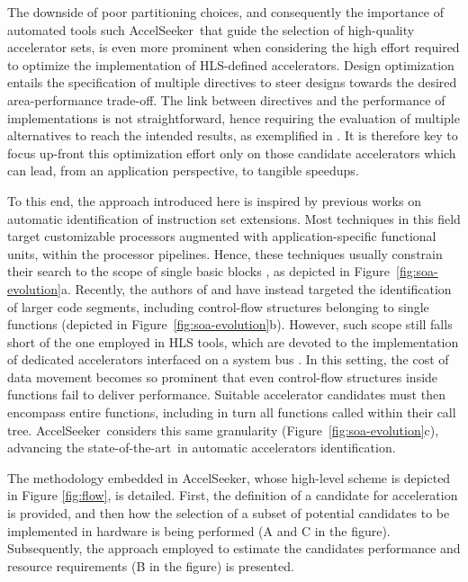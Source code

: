 \documentclass[]{usiinfthesis}
\newcommand{\aseeker}{{AccelSeeker}}
\newcommand{\SoTA}{{state-of-the-art}}
\begin{document}
The downside of poor partitioning choices, and consequently the
importance of automated tools such \aseeker\ that guide the selection
of high-quality accelerator sets, is even more prominent when
considering the high effort required to optimize the implementation of
HLS-defined accelerators. Design optimization entails the
specification of multiple directives to steer designs towards the
desired area-performance trade-off. The link between directives and
the performance of implementations is not straightforward, hence
requiring the evaluation of multiple alternatives to reach the
intended results, as exemplified in \cite{SchaferJun12}
\cite{ZuluagaJun12} \cite{FerrettiJan18} \cite{LiuJun13}. It is
therefore key to focus up-front this optimization effort only on those
candidate accelerators which can lead, from an application
perspective, to tangible speedups.\par

To this end, the approach introduced here is inspired by previous works 
on automatic
identification of instruction set extensions. Most techniques in this
field target customizable processors augmented with
application-specific functional units, within the processor pipelines.
Hence, these techniques usually constrain their search to the scope of
single basic blocks \cite{PozziJul06} \cite{GiaquintaMar15}, as
depicted in Figure~\ref{fig:soa-evolution}a.  Recently, the authors of
\cite{ZacharopoulosApr19} and \cite{OppermannJul16} have instead
targeted the identification of larger code segments, including
control-flow structures belonging to single functions (depicted in
Figure~\ref{fig:soa-evolution}b).  However, such scope still falls
short of the one employed in HLS tools, which are devoted to the
implementation of dedicated accelerators interfaced on a system bus
\cite{CotaJun15}. In this setting, the cost of data movement becomes
so prominent that even control-flow structures inside functions fail
to deliver performance. Suitable accelerator candidates must then
encompass entire functions, including in turn all functions called
within their call tree. \aseeker\ considers this same granularity
(Figure~\ref{fig:soa-evolution}c), advancing the \SoTA\ in
automatic accelerators identification.


The methodology embedded in \aseeker, whose high-level scheme is depicted in Figure 
\ref{fig:flow}, is detailed.  
First, the definition of a candidate for acceleration is provided, and then how the 
selection of a subset of potential candidates to be implemented in hardware is being performed
(A and C in the figure). Subsequently, the approach employed to estimate the candidates 
performance and resource requirements (B in the figure) is presented.
\end{document}

